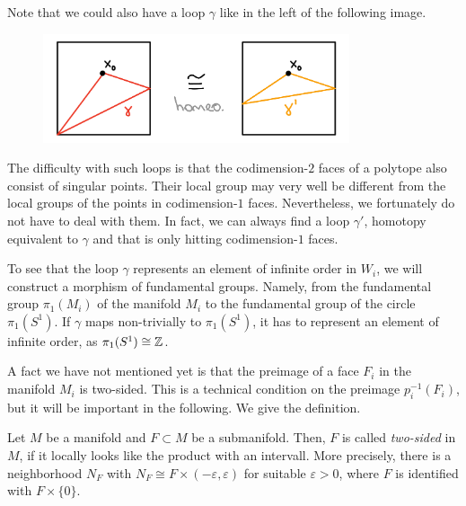 \newpage
\begin{remark}
    Note that we could also have a loop \(\gamma\) like in the left of the following image.
    \begin{figure}[h!]
        \label{fig:badray}
        \centering
        \includegraphics[height=3.2cm]{gfx/Equivalent loops.png}
    \end{figure}\vspace*{-\parskip}

    \noindent
    The difficulty with such loops is that the codimension-\(2\) faces of a polytope also consist of singular points.
    Their local group may very well be different from the local groups of the points in codimension-\(1\) faces.
    Nevertheless, we fortunately do not have to deal with them.
    In fact, we can always find a loop \(\gamma'\), homotopy equivalent to \(\gamma\) and that is only hitting codimension-\(1\) faces.
\end{remark}


To see that the loop \(\gamma\) represents an element of infinite order in \(W_i\), we will construct a morphism of fundamental groups.
Namely, from the fundamental group \(\pi_1(M_i)\) of the manifold \(M_i\) to the fundamental group of the circle \(\pi_1(S^1)\).
If \(\gamma\) maps non-trivially to \(\pi_1(S^1)\), it has to represent an element of infinite order, as \(\pi_1(S^1) \cong \mathbb{Z}\).

A fact we have not mentioned yet is that the preimage of a face \(F_i\) in the manifold \(M_i\) is two-sided.
This is a technical condition on the preimage \(p_i^{-1}(F_i)\), but it will be important in the following.
We give the definition.

\begin{definition}
    Let \(M\) be a manifold and \(F \subset M\) be a submanifold.
    Then, \(F\) is called \emph{two-sided} in \(M\), if it locally looks like the product with an intervall.
    More precisely, there is a neighborhood \(N_F\) with \(N_F \cong F \times (-\varepsilon, \varepsilon)\) for suitable \(\varepsilon > 0\), where \(F\) is identified with \(F \times \{0\}\).
\end{definition}

